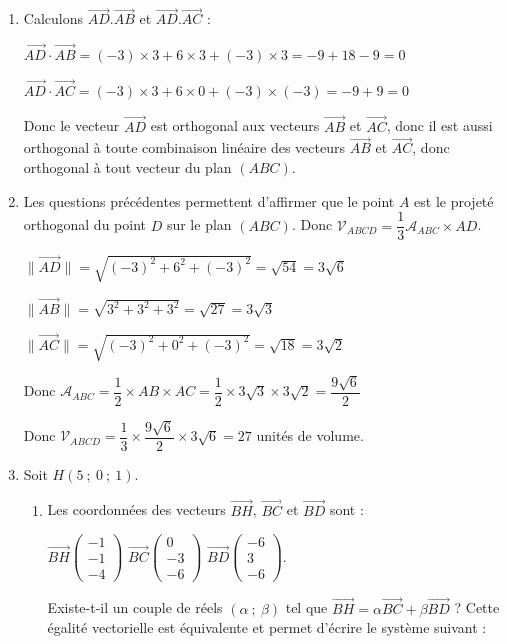 \documentclass[10pt]{article}
\providecommand{\vect}[1]{\overrightarrow{#1}}
\begin{document}
\begin{enumerate}
Le triangle $ABC$ est rectangle est rectangle en $A$.
\item Calculons $\vect{AD}.\vect{AB}$ et $\vect{AD}.\vect{AC}$ :

$\vect{AD} \cdot \vect{AB}= (-3)\times 3+6\times 3 + (-3)\times 3 = - 9+18-9=0$

$\vect{AD} \cdot \vect{AC}= (-3)\times 3+6\times 0 + (-3)\times (-3)=-9+9=0$

Donc le vecteur $\vect{AD}$ est orthogonal aux vecteurs $\vect{AB}$ et $\vect{AC}$, donc il est aussi orthogonal à toute combinaison linéaire des vecteurs $\vect{AB}$ et $\vect{AC}$, donc orthogonal à tout vecteur du plan $(ABC)$.
	\item Les questions précédentes permettent d'affirmer que le point $A$ est le projeté orthogonal du point $D$ sur le plan $(ABC)$. Donc $\mathcal{V}_{ABCD} = \dfrac13 \mathcal{A}_{ABC} \times AD$.
	
$\lVert\vect{AD}\rVert=\sqrt{(-3)^2+6^2+(-3)^2}=\sqrt{54}=3\sqrt{6}$

$\lVert\vect{AB}\rVert=\sqrt{3^2+3^2+3^2}=\sqrt{27}=3\sqrt{3}$

$\lVert\vect{AC}\rVert=\sqrt{(-3)^2+0^2+(-3)^2}=\sqrt{18}=3\sqrt{2}$
	
	Donc $\mathcal{A}_{ABC}=\dfrac{1}{2}\times AB\times AC=\dfrac{1}{2} \times 3\sqrt{3} \times 3\sqrt{2}=\dfrac{9\sqrt{6}}{2}$
	
	Donc $\mathcal{V}_{ABCD}=\dfrac13 \times \dfrac{9\sqrt{6}}{2} \times 3\sqrt{6}= 27 $ unités de volume.
\item Soit $H(5~;~0~;~1)$.
	\begin{enumerate}
		\item Les coordonnées des vecteurs $\vect{BH}$, $\vect{BC}$ et $\vect{BD}$ sont :

\(\overrightarrow{BH}\begin{pmatrix}-1\\-1\\-4\end{pmatrix}\) \quad \(\overrightarrow{BC}\begin{pmatrix}0\\- 3\\- 6\end{pmatrix}\) \quad \(\overrightarrow{BD}\begin{pmatrix}- 6\\3\\- 6\end{pmatrix}\).

Existe-t-il un couple de réels $(\alpha~;~\beta)$ tel que $\vect{BH}=\alpha\vect{BC}+\beta\vect{BD}$ ? Cette égalité vectorielle est équivalente et permet d'écrire le système suivant :


\end{enumerate}
\end{enumerate}
\end{document}
